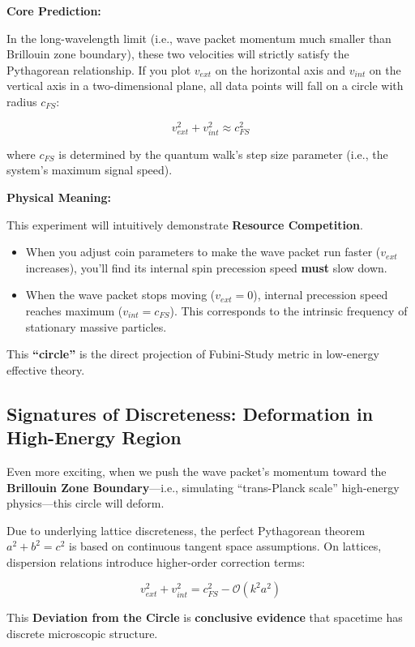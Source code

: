 \textbf{Core Prediction:}

In the long-wavelength limit (i.e., wave packet momentum much smaller than Brillouin zone boundary), these two velocities will strictly satisfy the Pythagorean relationship. If you plot $v_{ext}$ on the horizontal axis and $v_{int}$ on the vertical axis in a two-dimensional plane, all data points will fall on a circle with radius $c_{FS}$:

$$v_{ext}^2 + v_{int}^2 \approx c_{FS}^2$$

where $c_{FS}$ is determined by the quantum walk's step size parameter (i.e., the system's maximum signal speed).

\textbf{Physical Meaning:}

This experiment will intuitively demonstrate \textbf{Resource Competition}.

\begin{itemize}
\item When you adjust coin parameters to make the wave packet run faster ($v_{ext}$ increases), you'll find its internal spin precession speed \textbf{must} slow down.

\item When the wave packet stops moving ($v_{ext}=0$), internal precession speed reaches maximum ($v_{int}=c_{FS}$). This corresponds to the intrinsic frequency of stationary massive particles.
\end{itemize}

This \textbf{``circle''} is the direct projection of Fubini-Study metric in low-energy effective theory.

\subsection{Signatures of Discreteness: Deformation in High-Energy Region}

Even more exciting, when we push the wave packet's momentum toward the \textbf{Brillouin Zone Boundary}---i.e., simulating ``trans-Planck scale'' high-energy physics---this circle will deform.

Due to underlying lattice discreteness, the perfect Pythagorean theorem $a^2+b^2=c^2$ is based on continuous tangent space assumptions. On lattices, dispersion relations introduce higher-order correction terms:

$$v_{ext}^2 + v_{int}^2 = c_{FS}^2 - \mathcal{O}(k^2 a^2)$$

This \textbf{Deviation from the Circle} is \textbf{conclusive evidence} that spacetime has discrete microscopic structure.

